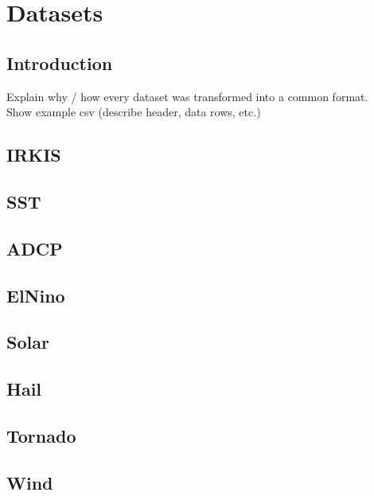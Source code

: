 
\chapter{Datasets} %

\label{datasets} %



\section{Introduction}
\label{datasets:intro}

Explain why / how every dataset was transformed into a common format.\\
Show example csv (describe header, data rows, etc.)




\section{IRKIS}
\label{datasets:irkis}

\section{SST}
\label{datasets:sst}

\section{ADCP}
\label{datasets:adcp}

\section{ElNino}
\label{datasets:elnino}

\section{Solar}
\label{datasets:solar}

\section{Hail}
\label{datasets:hail}

\section{Tornado}
\label{datasets:tornado}

\section{Wind}
\label{datasets:wind}